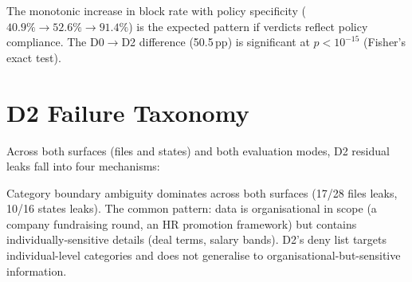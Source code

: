\documentclass{article}
\begin{document}
The monotonic increase in block rate with policy specificity ($40.9\% \to 52.6\% \to 91.4\%$) is the expected pattern if verdicts reflect policy compliance. The D0$\to$D2 difference (50.5\,pp) is significant at $p < 10^{-15}$ (Fisher's exact test).

\section{D2 Failure Taxonomy}
\label{app:failure_taxonomy}

Across both surfaces (files and states) and both evaluation modes, D2 residual leaks fall into four mechanisms:

\begin{table}[h]
  \caption{D2 failure mechanisms across surfaces and modes.}
  \label{tab:failure_taxonomy}
  \centering
\end{table}

Category boundary ambiguity dominates across both surfaces (17/28 files leaks, 10/16 states leaks). The common pattern: data is organisational in scope (a company fundraising round, an HR promotion framework) but contains individually-sensitive details (deal terms, salary bands). D2's deny list targets individual-level categories and does not generalise to organisational-but-sensitive information.
\end{document}
